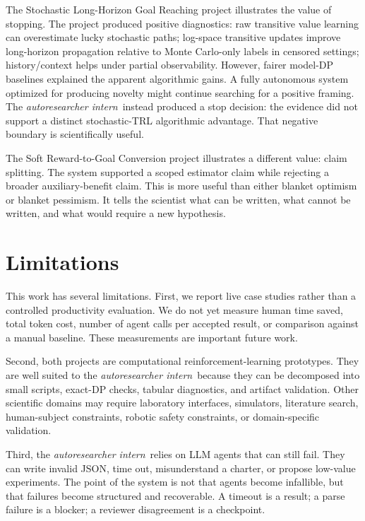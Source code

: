 \documentclass{article}
\newcommand{\intern}{\emph{autoresearcher intern}}
\begin{document}
The Stochastic Long-Horizon Goal Reaching project illustrates the value of stopping. The project produced positive diagnostics: raw transitive value learning can overestimate lucky stochastic paths; log-space transitive updates improve long-horizon propagation relative to Monte Carlo-only labels in censored settings; history/context helps under partial observability. However, fairer model-DP baselines explained the apparent algorithmic gains. A fully autonomous system optimized for producing novelty might continue searching for a positive framing. The \intern\ instead produced a stop decision: the evidence did not support a distinct stochastic-TRL algorithmic advantage. That negative boundary is scientifically useful.

The Soft Reward-to-Goal Conversion project illustrates a different value: claim splitting. The system supported a scoped estimator claim while rejecting a broader auxiliary-benefit claim. This is more useful than either blanket optimism or blanket pessimism. It tells the scientist what can be written, what cannot be written, and what would require a new hypothesis.

\section{Limitations}

This work has several limitations. First, we report live case studies rather than a controlled productivity evaluation. We do not yet measure human time saved, total token cost, number of agent calls per accepted result, or comparison against a manual baseline. These measurements are important future work.

Second, both projects are computational reinforcement-learning prototypes. They are well suited to the \intern\ because they can be decomposed into small scripts, exact-DP checks, tabular diagnostics, and artifact validation. Other scientific domains may require laboratory interfaces, simulators, literature search, human-subject constraints, robotic safety constraints, or domain-specific validation.

Third, the \intern\ relies on LLM agents that can still fail. They can write invalid JSON, time out, misunderstand a charter, or propose low-value experiments. The point of the system is not that agents become infallible, but that failures become structured and recoverable. A timeout is a result; a parse failure is a blocker; a reviewer disagreement is a checkpoint.
\end{document}
